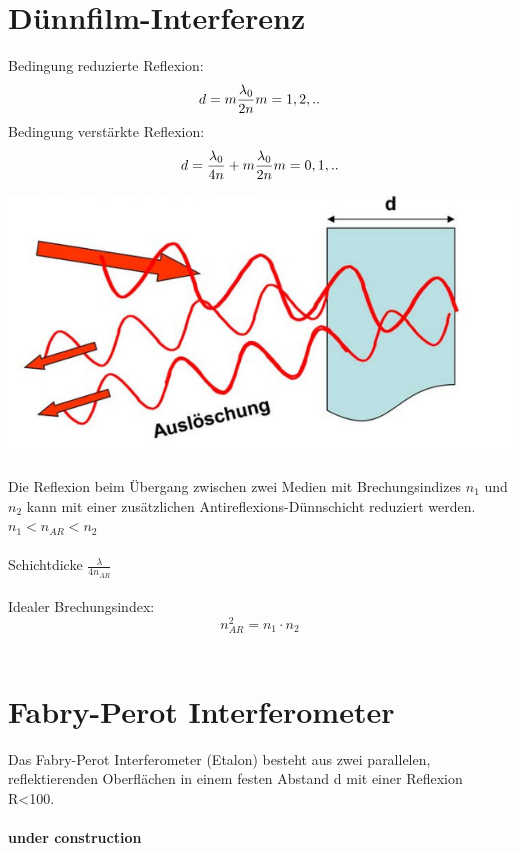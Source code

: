 \section{Dünnfilm-Interferenz}
Bedingung reduzierte Reflexion:
\[
	d=m\frac{\lambda_0}{2n} \\ m=1,2,.. \\ \\
\]
Bedingung verstärkte Reflexion:
\[
	d=\frac{\lambda_0}{4n}+m\frac{\lambda_0}{2n} \\ m=0,1,..\\ \\
\]
\begin{center}
	\includegraphics[scale = 0.2]{images/df_interferenz.jpg}
\end{center}
Die Reflexion beim Übergang zwischen zwei Medien mit Brechungsindizes $n_1$ und $n_2$ kann mit einer zusätzlichen Antireflexions-Dünnschicht reduziert werden. \\
$n_1< n_{AR}<n_2$ \\
\\
Schichtdicke $\frac{\lambda}{4 n_{AR}}$
\\
\\
Idealer Brechungsindex:
\[
	 n_{AR}^2=n_1\cdot n_2
\]
\\
\section{Fabry-Perot Interferometer}
Das Fabry-Perot Interferometer (Etalon) besteht aus zwei parallelen, reflektierenden Oberflächen in einem festen Abstand d mit einer Reflexion R<100. 
\\
\\
\textbf{ under construction}
\\
